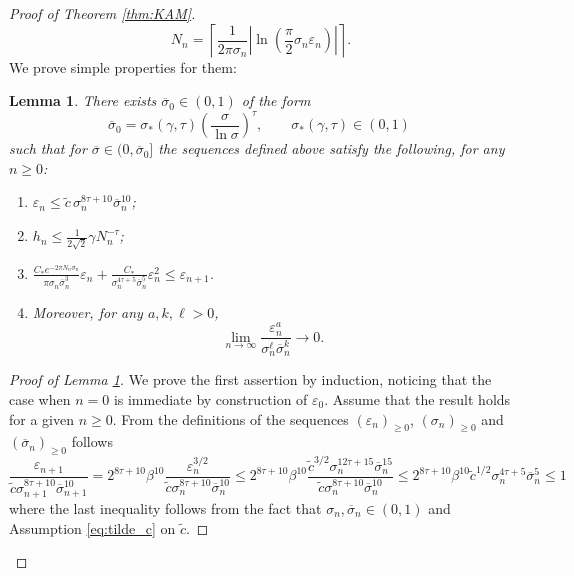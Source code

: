 \documentclass[10pt,a4paper]{amsart}
\newtheorem{lemma}{Lemma}
\begin{document}
\begin{proof}[Proof of Theorem \ref{thm:KAM}]
\[
N_n = \left\lceil
\frac{1}{2\pi\sigma_n}
\left|
\ln\left(
\frac{\pi}{2}\sigma_n\varepsilon_n
\right)
\right|
\right\rceil.
\]
We prove simple properties for them:
\begin{lemma}
    \label{lemma:prop_seq_eps_N}
    There exists $\overline\sigma_0\in(0,1)$ of the form
    \[
    \overline\sigma_0 = \sigma_\ast(\gamma,\tau)
    \left(\frac{\sigma}{\ln\sigma}\right)^\tau
    ,\qquad \sigma_\ast(\gamma,\tau)\in(0,1)
    \
    \]
    such that for $\overline\sigma\in(0,\overline\sigma_0]$ the sequences defined above satisfy the following, for any $n\geq 0$:
    \begin{enumerate}
        \item $\varepsilon_n\leq \tilde c \,\sigma_n^{8\tau+10}\overline\sigma_n^{10}$;
        \item $h_n \leq \tfrac{1}{2\sqrt 2}\gamma N_n^{-\tau}$;
        \item $\frac{C_\ast e^{-2\pi N_n\sigma_n}}{\pi\sigma_n\overline\sigma_n^3}\varepsilon_n + \frac{C_\ast}{\sigma_n^{4\tau+5}\overline\sigma_n^5}\varepsilon_n^2\leq \varepsilon_{n+1}$.
        \item \label{cond:fast_decrease} Moreover, for any $a, k,\ell > 0$, 
        \[
        \lim_{n \to \infty} \frac{\varepsilon_n^a}{\sigma_n^{\ell}\overline\sigma_n^{k}} \to 0.
        \]
    \end{enumerate}
\end{lemma}

\begin{proof}[Proof of Lemma \ref{lemma:prop_seq_eps_N}]
We prove the first assertion by induction, noticing that the case when $n=0$ is immediate by construction of $\varepsilon_0$. Assume that the result holds for a given $n\geq 0$. From the definitions of the sequences $(\varepsilon_n)_{\geq 0}$, $(\sigma_n)_{\geq 0}$ and $(\overline\sigma_n)_{\geq 0}$ follows
\[
\frac{\varepsilon_{n+1}}{\tilde c\sigma_{n+1}^{8\tau+10}\overline\sigma_{n+1}^{10}}
= 
2^{8\tau+10}\beta^{10}\frac{\varepsilon_{n}^{3/2}}{\tilde c\sigma_{n}^{8\tau+10}\overline\sigma_{n}^{10}}
\leq 
2^{8\tau+10}\beta^{10} \frac{\tilde c^{3/2}\sigma_{n}^{12\tau+15}\overline\sigma_{n}^{15}}{\tilde c\sigma_{n}^{8\tau+10}\overline\sigma_{n}^{10}}
\leq 
2^{8\tau+10}\beta^{10}\tilde c^{1/2}
\sigma_{n}^{4\tau+5}\overline\sigma_{n}^{5}\leq 1
\]
where the last inequality follows from the fact that $\sigma_n,\overline\sigma_n\in(0,1)$ and Assumption \eqref{eq:tilde_c} on $\tilde c$. 


\end{proof}
\end{proof}
\end{document}
